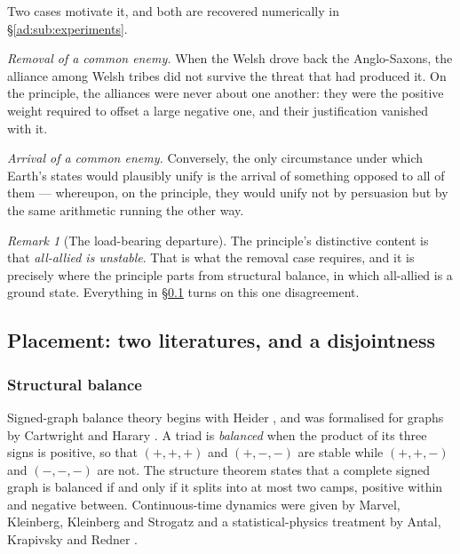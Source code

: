 \documentclass[11pt]{article}
\numberwithin{equation}{section}
\theoremstyle{plain}
\theoremstyle{definition}
\theoremstyle{remark}
\newtheorem{remark}[theorem]{Remark}
\begin{document}
Two cases motivate it, and both are recovered numerically in
\S\ref{ad:sub:experiments}.

\emph{Removal of a common enemy.} When the Welsh drove back the
Anglo-Saxons, the alliance among Welsh tribes did not survive the
threat that had produced it. On the principle, the alliances were never
about one another: they were the positive weight required to offset a
large negative one, and their justification vanished with it.

\emph{Arrival of a common enemy.} Conversely, the only circumstance
under which Earth's states would plausibly unify is the arrival of
something opposed to all of them --- whereupon, on the principle, they
would unify not by persuasion but by the same arithmetic running the
other way.

\begin{remark}[The load-bearing departure]\label{ad:rem:departure}
The principle's distinctive content is that \emph{all-allied is
unstable}. That is what the removal case requires, and it is precisely
where the principle parts from structural balance, in which all-allied
is a ground state. Everything in \S\ref{ad:sub:placement} turns on this
one disagreement.
\end{remark}

\subsection{Placement: two literatures, and a disjointness}
\label{ad:sub:placement}

\subsubsection{Structural balance}\label{ad:subsub:heider}

Signed-graph balance theory begins with Heider \cite{Hei46}, and was
formalised for graphs by Cartwright and Harary \cite{CH56}. A triad is
\emph{balanced} when the product of its three signs is positive, so that
$(+,+,+)$ and $(+,-,-)$ are stable while $(+,+,-)$ and $(-,-,-)$ are
not. The structure theorem states that a complete signed graph is
balanced if and only if it splits into at most two camps, positive
within and negative between. Continuous-time dynamics were given by
Marvel, Kleinberg, Kleinberg and Strogatz \cite{MKKS11} and a
statistical-physics treatment by Antal, Krapivsky and Redner
\cite{AKR05}.
\end{document}
